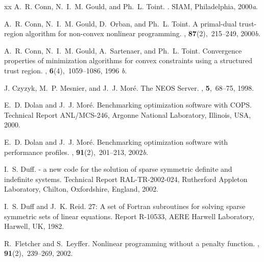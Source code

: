 \documentclass[twoside]{article}
\begin{document}
\begin{thebibliography}{xx}
A.~R. Conn, N.~I.~M. Gould, and Ph.~L. Toint.
.
\newblock SIAM, Philadelphia, 2000{\em a}.

A.~R. Conn, N.~I.~M. Gould, D.~Orban, and Ph.~L. Toint.
\newblock A primal-dual trust-region algorithm for non-convex nonlinear
  programming.
, {\bf 87}(2),~215--249, 2000{\em b}.

A.~R. Conn, N.~I.~M. Gould, A.~Sartenaer, and Ph.~L. Toint.
\newblock Convergence properties of minimization algorithms for convex
  constraints using a structured trust region.
, {\bf 6}(4),~1059--1086, 1996{\em
  b}.

J. Czyzyk, M.~P. Mesnier, and J.~J. Mor\'{e}.
\newblock The {NEOS} {S}erver.
, {\bf
  5},~68--75, 1998.

E.~D. Dolan and J.~J. Mor\'{e}.
\newblock Benchmarking optimization software with {COPS}.
\newblock Technical Report ANL/MCS-246, Argonne National Laboratory, Illinois,
  USA, 2000.

E.~D. Dolan and J.~J. Mor\'{e}.
\newblock Benchmarking optimization software with performance profiles.
, {\bf 91}(2),~201--213, 2002{\em b}.

I.~S. Duff.
 - a new code for the solution of sparse symmetric 
  definite and indefinite systems.
\newblock Technical Report RAL-TR-2002-024, Rutherford Appleton Laboratory,
  Chilton, Oxfordshire, England, 2002.

I.~S. Duff and J.~K. Reid.
27: A set of {F}ortran subroutines for solving sparse symmetric
  sets of linear equations.
\newblock Report R-10533, {AERE} {H}arwell Laboratory, Harwell, UK, 1982.

R.~Fletcher and S.~Leyffer.
\newblock Nonlinear programming without a penalty function.
, {\bf 91}(2),~239--269, 2002.


\end{thebibliography}
\end{document}
